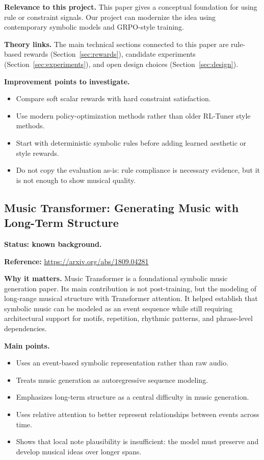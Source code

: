 \documentclass[11pt]{article}
\begin{document}
\textbf{Relevance to this project.}
This paper gives a conceptual foundation for using rule or constraint signals.
Our project can modernize the idea using contemporary symbolic models and
GRPO-style training.

\textbf{Theory links.}
The main technical sections connected to this paper are rule-based rewards
(Section~\ref{sec:rewards}), candidate experiments (Section~\ref{sec:experiments}),
and open design choices (Section~\ref{sec:design}).

\textbf{Improvement points to investigate.}
\begin{itemize}[leftmargin=*]
  \item Compare soft scalar rewards with hard constraint satisfaction.
  \item Use modern policy-optimization methods rather than older RL-Tuner style
  methods.
  \item Start with deterministic symbolic rules before adding learned aesthetic
  or style rewards.
  \item Do not copy the evaluation as-is: rule compliance is necessary evidence,
  but it is not enough to show musical quality.
\end{itemize}

\subsection{Music Transformer: Generating Music with Long-Term Structure}
\label{sec:paper-music-transformer}

\textbf{Status: known background.}

\textbf{Reference:}
\url{https://arxiv.org/abs/1809.04281}

\textbf{Why it matters.}
Music Transformer is a foundational symbolic music generation paper. Its main
contribution is not post-training, but the modeling of long-range musical
structure with Transformer attention. It helped establish that symbolic music can
be modeled as an event sequence while still requiring architectural support for
motifs, repetition, rhythmic patterns, and phrase-level dependencies.

\textbf{Main points.}
\begin{itemize}[leftmargin=*]
  \item Uses an event-based symbolic representation rather than raw audio.
  \item Treats music generation as autoregressive sequence modeling.
  \item Emphasizes long-term structure as a central difficulty in music
  generation.
  \item Uses relative attention to better represent relationships between events
  across time.
  \item Shows that local note plausibility is insufficient: the model must
  preserve and develop musical ideas over longer spans.
\end{itemize}
\end{document}
